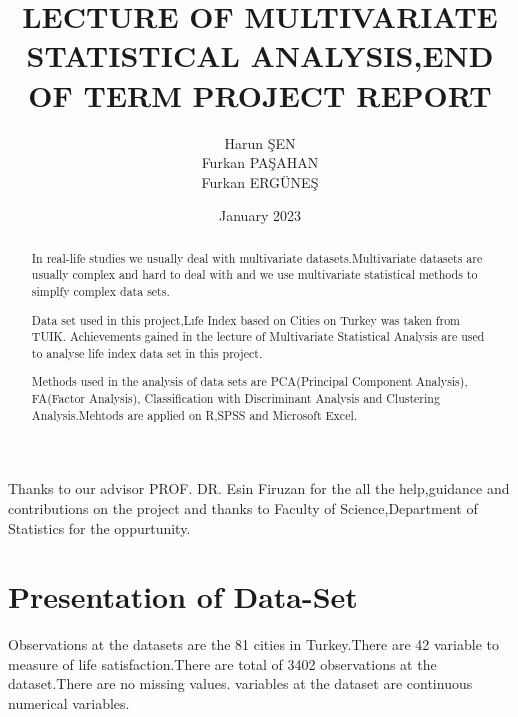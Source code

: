 \documentclass[12pt,twoside]{deuthesis}
\title{LECTURE OF MULTIVARIATE STATISTICAL ANALYSIS,END OF TERM PROJECT REPORT}
\author{Harun ŞEN \\ Furkan PAŞAHAN \\ Furkan ERGÜNEŞ} %
\date{January 2023}
\begin{document}
  \maketitle

\frontmatter %
\pagestyle{empty} %

  \begin{acknowledgements}
    Thanks to our advisor PROF. DR. Esin Firuzan for the all the help,guidance and contributions on the project and thanks to Faculty of Science,Department of Statistics for the oppurtunity.
  \end{acknowledgements}
\begin{abstract}
	In real-life studies we usually deal with multivariate datasets.Multivariate datasets are usually complex and hard to deal with and we use multivariate statistical methods to simplfy complex data sets.

Data set used in this project,Lıfe Index based on Cities on Turkey was taken from TUIK.
Achievements gained in the lecture of Multivariate Statistical Analysis are used to analyse life index data set in this project.

Methods used in the analysis of data sets are PCA(Principal Component Analysis), FA(Factor Analysis), Classification with Discriminant Analysis and Clustering Analysis.Mehtods are applied on R,SPSS and Microsoft Excel.
\end{abstract}

  \hypersetup{linkcolor=black}
  \setcounter{tocdepth}{2}
  \tableofcontents

  \listoftables

  \listoffigures


\newlength{\cslhangindent}
\setlength{\cslhangindent}{1.5em}
\newenvironment{CSLReferences}%
  {}%
  {\par}
\newenvironment{cslreferences}%
  {}%
  {\par}

\mainmatter %
\pagestyle{fancyplain} %

\hypertarget{rmd-basics}{%
\chapter{Presentation of Data-Set}\label{rmd-basics}}

Observations at the datasets are the 81 cities in Turkey.There are 42 variable to measure of life satisfaction.There are total of 3402 observations at the dataset.There are no missing values.
variables at the dataset are continuous numerical variables.
\end{document}
